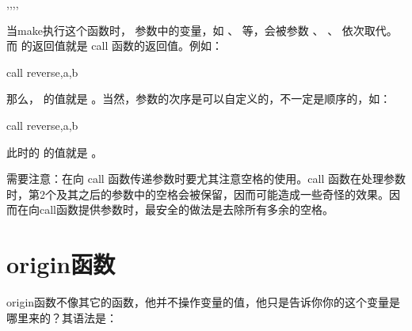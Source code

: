\documentclass[a4paper,10pt]{sphinxmanual}
\begin{document}
\begin{sphinxVerbatim}[commandchars=\\\{\}]
 \PYGZlt{}\PYGZgt{},\PYGZlt{}\PYGZgt{},\PYGZlt{}\PYGZgt{},,\PYGZlt{}\PYGZgt{}
\end{sphinxVerbatim}

当make执行这个函数时，  参数中的变量，如  、  等，会被参数  、  、  依次取代。而  的返回值就是 call 函数的返回值。例如：

\begin{sphinxVerbatim}[commandchars=\\\{\}]
    

  call reverse,a,b
\end{sphinxVerbatim}

那么，  的值就是  。当然，参数的次序是可以自定义的，不一定是顺序的，如：

\begin{sphinxVerbatim}[commandchars=\\\{\}]
    

  call reverse,a,b
\end{sphinxVerbatim}

此时的  的值就是  。

需要注意：在向 call 函数传递参数时要尤其注意空格的使用。call 函数在处理参数时，第2个及其之后的参数中的空格会被保留，因而可能造成一些奇怪的效果。因而在向call函数提供参数时，最安全的做法是去除所有多余的空格。


\section{origin函数}
\label{\detokenize{functions:origin}}
origin函数不像其它的函数，他并不操作变量的值，他只是告诉你你的这个变量是哪里来的？其语法是：
\end{document}
